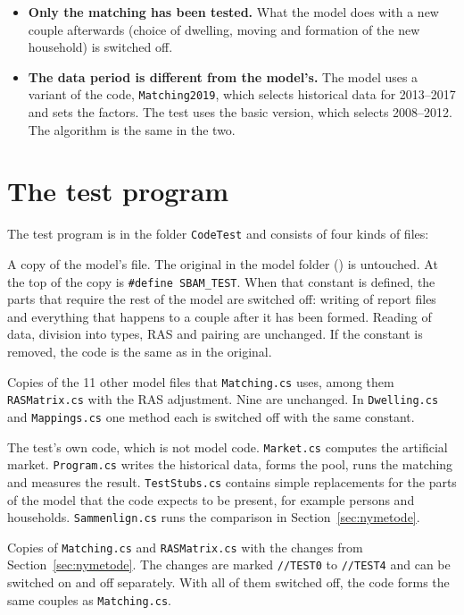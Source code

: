 \documentclass[12pt,a4paper]{article}
\newcommand{\kode}[1]{\texttt{#1}}
\begin{document}
\begin{itemize}
test program and not read from inside the code (Section~\ref{sec:fortolkning}).
\item \textbf{Only the matching has been tested.} What the model does with a new couple afterwards
(choice of dwelling, moving and formation of the new household) is switched off.
\item \textbf{The data period is different from the model's.} The model uses a variant of the code,
\kode{Matching2019}, which selects historical data for 2013--2017 and sets the factors. The test
uses the basic version, which selects 2008--2012. The algorithm is the same in the two.
\end{itemize}


\section{The test program}

The test program is in the folder \kode{CodeTest} and consists of four kinds of files:

\begin{description}[leftmargin=1.5em, style=nextline]
\item[\kode{Matching.cs}] A copy of the model's file. The original in the model folder
() is untouched. At the top of the copy is \kode{\#define SBAM\_TEST}.
When that constant is defined, the parts that require the rest of the model are switched off:
writing of report files and everything that happens to a couple after it has been formed. Reading
of data, division into types, RAS and pairing are unchanged. If the constant is removed, the code
is the same as in the original.

\item[\kode{SmileFiles\textbackslash}] Copies of the 11 other model files that \kode{Matching.cs}
uses, among them \kode{RASMatrix.cs} with the RAS adjustment. Nine are unchanged. In
\kode{Dwelling.cs} and \kode{Mappings.cs} one method each is switched off with the same constant.

\item[\kode{Test\textbackslash}] The test's own code, which is not model code. \kode{Market.cs}
computes the artificial market. \kode{Program.cs} writes the historical data, forms the pool, runs
the matching and measures the result. \kode{TestStubs.cs} contains simple replacements for the
parts of the model that the code expects to be present, for example persons and households.
\kode{Sammenlign.cs} runs the comparison in Section~\ref{sec:nymetode}.

\item[\kode{Matching\_test.cs} and \kode{RASMatrix\_test.cs}] Copies of \kode{Matching.cs} and
\kode{RASMatrix.cs} with the changes from Section~\ref{sec:nymetode}. The changes are marked
\kode{//TEST0} to \kode{//TEST4} and can be switched on and off separately. With all of them
switched off, the code forms the same couples as \kode{Matching.cs}.
\end{description}
\end{document}
